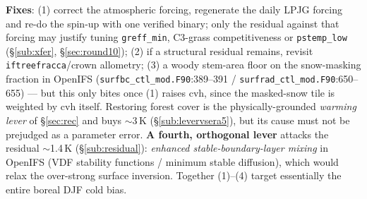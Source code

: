 \documentclass[10pt]{article}
\begin{document}
\textbf{Fixes}: (1) correct the atmospheric forcing, regenerate the daily LPJG forcing and re-do the spin-up with
one verified binary; only the residual against that forcing may justify tuning \texttt{greff\_min}, C3-grass
competitiveness or \texttt{pstemp\_low} (\S\ref{sub:xfer}, \S\ref{sec:round10}); (2) if a structural residual remains,
revisit \texttt{iftreefracca}/crown allometry; (3) a woody stem-area floor on the
snow-masking fraction in OpenIFS
(\texttt{surfbc\_ctl\_mod.F90}:389--391 / \texttt{surfrad\_ctl\_mod.F90}:650--655) --- but this only bites once (1)
raises cvh, since the masked-snow tile is weighted by cvh itself. Restoring forest cover is the physically-grounded
\emph{warming lever} of \S\ref{sec:rec} and buys $\sim$3\,K (\S\ref{sub:levervsera5}), but its cause must not be
prejudged as a parameter error. \textbf{A fourth, orthogonal
lever} attacks the residual $\sim$1.4\,K (\S\ref{sub:residual}): \emph{enhanced stable-boundary-layer mixing} in
OpenIFS (VDF stability functions / minimum stable diffusion), which would relax the over-strong surface inversion.
Together (1)--(4) target essentially the entire boreal DJF cold bias.
\end{document}

